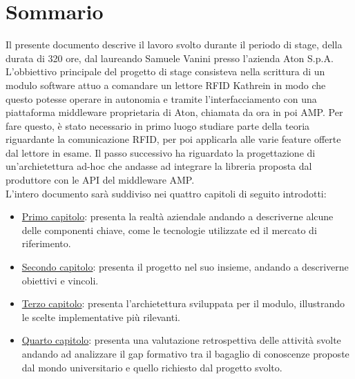 
\cleardoublepage
{}
{}
\begingroup
\let\clearpage\relax
\let\cleardoublepage\relax
\let\cleardoublepage\relax

\chapter*{Sommario}

Il presente documento descrive il lavoro svolto durante il periodo di stage, della durata di 320 ore, 
dal laureando Samuele Vanini presso l'azienda Aton S.p.A. \\
L'obbiettivo principale del progetto di stage consisteva nella scrittura di un modulo software 
attuo a comandare un lettore RFID Kathrein in modo che questo potesse operare in autonomia
e tramite l'interfacciamento con una piattaforma middleware proprietaria di Aton, chiamata da ora in poi AMP.
Per fare questo, è stato necessario in primo luogo studiare parte della teoria riguardante la comunicazione
RFID, per poi applicarla alle varie feature offerte dal lettore in esame.
Il passo successivo ha riguardato la progettazione di un'archietettura ad-hoc che andasse ad integrare
la libreria proposta dal produttore con le API del middleware AMP. \\
L'intero documento sarà suddiviso nei quattro capitoli di seguito introdotti:
\begin{itemize}
    \item \hyperref[cap:introduzione]{Primo capitolo}: presenta la realtà aziendale andando a descriverne alcune delle componenti chiave, come le tecnologie
    utilizzate ed il mercato di riferimento.
    \item \hyperref[cap:lo-stage]{Secondo capitolo}: presenta il progetto nel suo insieme, andando a descriverne obiettivi e vincoli.
    \item \hyperref[cap:resoconto-progetto]{Terzo capitolo}: presenta l'archietettura sviluppata per il modulo, illustrando le
        scelte implementative più rilevanti.
    \item \hyperref[cap:conclusioni]{Quarto capitolo}: presenta una valutazione retrospettiva delle attività svolte andando ad analizzare il gap formativo
    tra il bagaglio di conoscenze proposte dal mondo universitario e quello richiesto dal progetto svolto.
\end{itemize}

%
%

\endgroup			

\vfill

